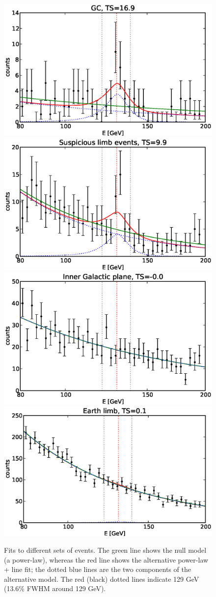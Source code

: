 \documentclass[aps,twocolumn,prd,superscriptaddress,showpacs,nofootinbib,fixfloat]{revtex4}
\begin{document}
\begin{figure}
  \centering
  \includegraphics[width=0.48\linewidth]{plots/counts_GC.eps}
  \includegraphics[width=0.48\linewidth]{plots/counts_suspiciousLimb.eps}
  \includegraphics[width=0.48\linewidth]{plots/counts_IGP.eps}
  \includegraphics[width=0.48\linewidth]{plots/counts_limb.eps}
  \caption{Fits to different sets of events. The green line
  shows the null model (a power-law), whereas the red line
  shows the alternative power-law + line fit; the dotted
  blue lines are the two components of the alternative
  model. The red (black) dotted lines indicate 129 GeV
  (13.6\% FWHM around 129 GeV).}
  \label{fig:spectra1}
\end{figure}
\end{document}
